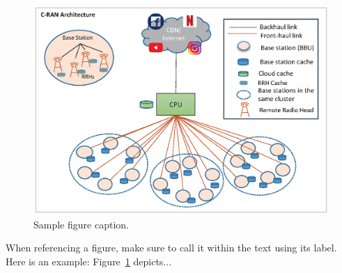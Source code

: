 \begin{figure}[ht]
\centerline{\includegraphics[width=0.8\linewidth]{files/figures/Architecture.eps}}
\caption{Sample figure caption.}
\label{fig0}
\end{figure}

When referencing a figure, make sure to call it within the text using its label. Here is an example: Figure~\ref{fig0} depicts... 